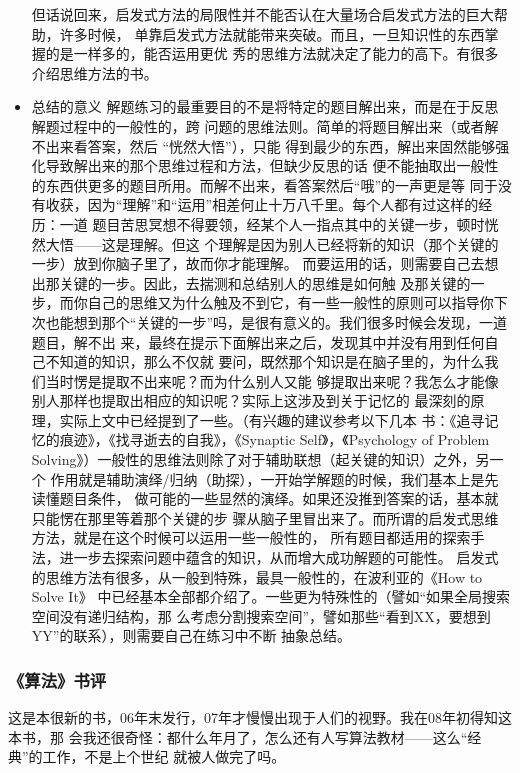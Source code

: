 \documentclass[11pt]{article}
\begin{document}
\begin{itemize}
但话说回来，启发式方法的局限性并不能否认在大量场合启发式方法的巨大帮助，许多时候，
单靠启发式方法就能带来突破。而且，一旦知识性的东西掌握的是一样多的，能否运用更优
秀的思维方法就决定了能力的高下。有很多介绍思维方法的书。
\item 总结的意义
\label{sec:orgheadline207}
解题练习的最重要目的不是将特定的题目解出来，而是在于反思解题过程中的一般性的，跨
问题的思维法则。简单的将题目解出来（或者解不出来看答案，然后 “恍然大悟”），只能
得到最少的东西，解出来固然能够强化导致解出来的那个思维过程和方法，但缺少反思的话
便不能抽取出一般性的东西供更多的题目所用。而解不出来，看答案然后“哦”的一声更是等
同于没有收获，因为“理解”和“运用”相差何止十万八千里。每个人都有过这样的经历：一道
题目苦思冥想不得要领，经某个人一指点其中的关键一步，顿时恍然大悟——这是理解。但这
个理解是因为别人已经将新的知识（那个关键的一步）放到你脑子里了，故而你才能理解。
而要运用的话，则需要自己去想出那关键的一步。因此，去揣测和总结别人的思维是如何触
及那关键的一步，而你自己的思维又为什么触及不到它，有一些一般性的原则可以指导你下
次也能想到那个“关键的一步”吗，是很有意义的。我们很多时候会发现，一道题目，解不出
来，最终在提示下面解出来之后，发现其中并没有用到任何自己不知道的知识，那么不仅就
要问，既然那个知识是在脑子里的，为什么我们当时愣是提取不出来呢？而为什么别人又能
够提取出来呢？我怎么才能像别人那样也提取出相应的知识呢？实际上这涉及到关于记忆的
最深刻的原理，实际上文中已经提到了一些。（有兴趣的建议参考以下几本
书：《追寻记忆的痕迹》，《找寻逝去的自我》，《Synaptic Self》，《Psychology of
Problem Solving》）一般性的思维法则除了对于辅助联想（起关键的知识）之外，另一个
作用就是辅助演绎/归纳（助探），一开始学解题的时候，我们基本上是先读懂题目条件，
做可能的一些显然的演绎。如果还没推到答案的话，基本就只能愣在那里等着那个关键的步
骤从脑子里冒出来了。而所谓的启发式思维方法，就是在这个时候可以运用一些一般性的，
所有题目都适用的探索手法，进一步去探索问题中蕴含的知识，从而增大成功解题的可能性。
启发式的思维方法有很多，从一般到特殊，最具一般性的，在波利亚的《How to Solve It》
中已经基本全部都介绍了。一些更为特殊性的（譬如“如果全局搜索空间没有递归结构，那
么考虑分割搜索空间”，譬如那些“看到XX，要想到YY”的联系），则需要自己在练习中不断
抽象总结。
\end{itemize}

\subsubsection*{《算法》书评}
\label{sec:orgheadline209}
这是本很新的书，06年末发行，07年才慢慢出现于人们的视野。我在08年初得知这本书，那
会我还很奇怪：都什么年月了，怎么还有人写算法教材——这么“经典”的工作，不是上个世纪
就被人做完了吗。
\end{document}
